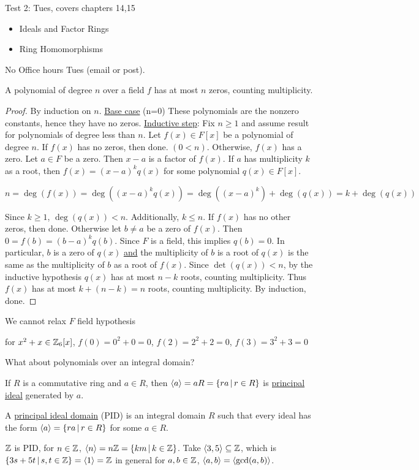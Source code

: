 \documentclass[]{article}
\begin{document}
Test 2: Tues, covers chapters 14,15
\begin{itemize}
	\item Ideals and Factor Rings
	\item Ring Homomorphisms
\end{itemize}
No Office hours Tues (email or post).
\begin{theorem}
	A polynomial of degree $n$ over a field $f$ has at most $n$ zeros, counting multiplicity.
\end{theorem}
\begin{proof}
	By induction on $n$.
	\ul{Base case} (n=0) These polynomials are the nonzero constants, hence they have no zeros.
	\ul{Inductive step}: Fix $n\geq1$ and assume result for polynomials of degree less than $n$.
	Let $f(x)\in F[x]$ be a polynomial of degree $n$.
	If $f(x)$ has no zeros, then done. $(0<n)$.
	Otherwise, $f(x)$ has a zero. Let $a\in F$ be a zero.
	Then $x-a$ is a factor of $f(x)$. If $a$ has multiplicity $k$ as a root, then $f(x)=(x-a)^kq(x)$ for some polynomial $q(x)\in F[x]$.
	\begin{note}
		$n=\deg(f(x))=\deg((x-a)^kq(x))=\deg((x-a)^k)+\deg(q(x)) = k+\deg(q(x))$
	\end{note}
	Since $k\geq1$, $\deg(q(x))<n$. Additionally, $k\leq n$.
	If $f(x)$ has no other zeros, then done. Otherwise let $b\neq a$ be a zero of $f(x)$.
	Then $0=f(b)=(b-a)^kq(b)$. Since $F$ is a field, this implies $q(b)=0$.
	In particular, $b$ is a zero of $q(x)$ \ul{and} the multiplicity of $b$ is a root of $q(x)$ is the same as the multiplicity of $b$ as a root of $f(x)$.
	Since $\det(q(x))<n$, by the inductive hypothesis $q(x)$ has at most $n-k$ roots, counting multiplicity.
	Thus $f(x)$ has at most $k+(n-k)=n$ roots, counting multiplicity.
	By induction, done.
\end{proof}

We cannot relax $F$ field hypothesis
\begin{example}
	for $x^2+x\in\mathbb{Z}_6[x]$, $f(0)=0^2+0=0$, $f(2)=2^2+2=0$, $f(3)=3^2+3=0$
\end{example}
\begin{question}
	What about polynomials over an integral domain?
\end{question}
\begin{recall}
	If $R$ is a commutative ring and $a\in R$, then $\left\langle a \right\rangle=aR=\left\{ ra \, \middle| \, r\in R \right\}$ is \ul{principal ideal} generated by $a$.
\end{recall}
\begin{definition}
	A \ul{principal ideal domain} (PID) is an integral domain $R$ such that every ideal has the form $\left\langle a \right\rangle=\left\{ ra \, \middle| \, r\in R \right\}$ for some $a\in R$.
\end{definition}
\begin{example}
	$\mathbb{Z}$ is PID, for $n\in\mathbb{Z}$, $\left\langle n \right\rangle=n\mathbb{Z}=\left\{ km \, \middle| \, k\in\mathbb{Z} \right\}$.
	Take $\left\langle 3,5 \right\rangle\subseteq\mathbb{Z}$, which is $\left\{ 3s+5t \, \middle| \, s,t\in\mathbb{Z} \right\}=\left\langle 1 \right\rangle=\mathbb{Z}$ in general for $a,b\in\mathbb{Z}$, $\left\langle a,b \right\rangle=\left\langle \gcd(a,b) \right\rangle$.
\end{example}
\end{document}
